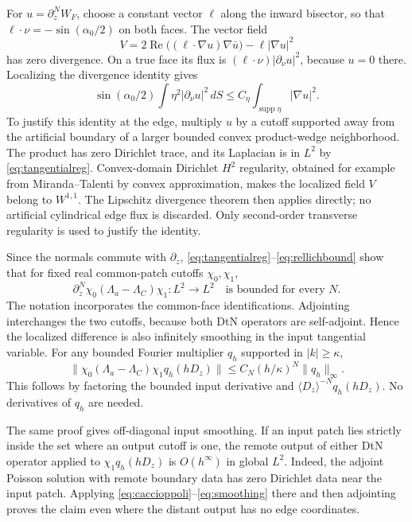 \documentclass[11pt]{amsart}
\numberwithin{equation}{section}
\theoremstyle{remark}
\begin{document}
For $u=\partial_z^NW_F$, choose a constant vector $\ell$ along the inward bisector, so that $\ell\cdot\nu=-\sin(\alpha_0/2)$ on both faces. The vector field
\begin{equation}\label{eq:rellich}
V=2\operatorname{Re}\big((\ell\cdot\nabla u)\nabla\bar u\big)-\ell|\nabla u|^2
\end{equation}
has zero divergence. On a true face its flux is $(\ell\cdot\nu)|\partial_\nu u|^2$, because $u=0$ there. Localizing the divergence identity gives
\begin{equation}\label{eq:rellichbound}
\sin(\alpha_0/2)\int\eta^2|\partial_\nu u|^2\,dS\le C_\eta\int_{\operatorname{supp}\eta}|\nabla u|^2 .
\end{equation}
To justify this identity at the edge, multiply $u$ by a cutoff supported away from the artificial boundary of a larger bounded convex product-wedge neighborhood. The product has zero Dirichlet trace, and its Laplacian is in $L^2$ by \eqref{eq:tangentialreg}. Convex-domain Dirichlet $H^2$ regularity, obtained for example from Miranda--Talenti by convex approximation, makes the localized field $V$ belong to $W^{1,1}$. The Lipschitz divergence theorem then applies directly; no artificial cylindrical edge flux is discarded. Only second-order transverse regularity is used to justify the identity.

Since the normals commute with $\partial_z$, \eqref{eq:tangentialreg}--\eqref{eq:rellichbound} show that for fixed real common-patch cutoffs $\chi_0,\chi_1$,
\begin{equation}\label{eq:smoothing}
\partial_z^N\chi_0(\Lambda_a-\Lambda_C)\chi_1:L^2\longrightarrow L^2\quad\text{is bounded for every }N .
\end{equation}
The notation incorporates the common-face identifications. Adjointing interchanges the two cutoffs, because both DtN operators are self-adjoint. Hence the localized difference is also infinitely smoothing in the input tangential variable. For any bounded Fourier multiplier $q_h$ supported in $|k|\ge\kappa$,
\begin{equation}\label{eq:multiplierbound}
\|\chi_0(\Lambda_a-\Lambda_C)\chi_1q_h(hD_z)\|\le C_N(h/\kappa)^N\|q_h\|_\infty .
\end{equation}
This follows by factoring the bounded input derivative and $\langle D_z\rangle^{-N}q_h(hD_z)$. No derivatives of $q_h$ are needed.

The same proof gives off-diagonal input smoothing. If an input patch lies strictly inside the set where an output cutoff is one, the remote output of either DtN operator applied to $\chi_1q_h(hD_z)$ is $O(h^\infty)$ in global $L^2$. Indeed, the adjoint Poisson solution with remote boundary data has zero Dirichlet data near the input patch. Applying \eqref{eq:caccioppoli}--\eqref{eq:smoothing} there and then adjointing proves the claim even where the distant output has no edge coordinates.
\end{document}
